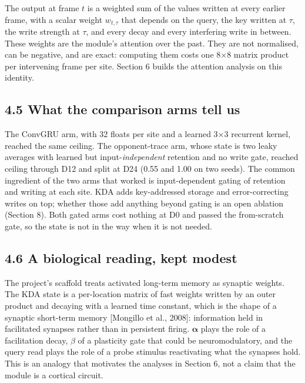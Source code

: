\documentclass[

]{article}
\begin{document}
The output at frame \(t\) is a weighted sum of the values written at every earlier frame, with a scalar weight \(w_{t,\tau}\) that depends on the query, the key written at \(\tau\), the write strength at \(\tau\), and every decay and every interfering write in between. These weights are the module's attention over the past. They are not normalised, can be negative, and are exact: computing them costs one 8×8 matrix product per intervening frame per site. Section 6 builds the attention analysis on this identity.



\subsection{4.5 What the comparison arms tell us}\label{what-the-comparison-arms-tell-us}



The ConvGRU arm, with 32 floats per site and a learned 3×3 recurrent kernel, reached the same ceiling. The opponent-trace arm, whose state is two leaky averages with learned but input-\emph{independent} retention and no write gate, reached ceiling through D12 and split at D24 (0.55 and 1.00 on two seeds). The common ingredient of the two arms that worked is input-dependent gating of retention and writing at each site. KDA adds key-addressed storage and error-correcting writes on top; whether those add anything beyond gating is an open ablation (Section 8). Both gated arms cost nothing at D0 and passed the from-scratch gate, so the state is not in the way when it is not needed.



\subsection{4.6 A biological reading, kept modest}\label{a-biological-reading-kept-modest}



The project's scaffold treats activated long-term memory as synaptic weights. The KDA state is a per-location matrix of fast weights written by an outer product and decaying with a learned time constant, which is the shape of a synaptic short-term memory {[}Mongillo et al., 2008{]}: information held in facilitated synapses rather than in persistent firing. \(\boldsymbol\alpha\) plays the role of a facilitation decay, \(\beta\) of a plasticity gate that could be neuromodulatory, and the query read plays the role of a probe stimulus reactivating what the synapses hold. This is an analogy that motivates the analyses in Section 6, not a claim that the module is a cortical circuit.
\end{document}
